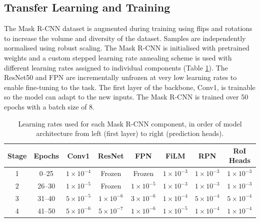 \documentclass[12pt]{article}
\begin{document}
\subsection{Transfer Learning and Training}

The Mask R-CNN dataset is augmented during training using flips and rotations to increase the volume and diversity of the dataset. Samples are independently normalised using robust scaling. The Mask R-CNN is initialised with pretrained weights and a custom stepped learning rate annealing scheme is used with different learning rates assigned to individual components (Table \ref{tab:stage_learning_rates}). The ResNet50 and FPN are incrementally unfrozen at very low learning rates to enable fine-tuning to the task. The first layer of the backbone, Conv1, is trainable so the model can adapt to the new inputs. The Mask R-CNN is trained over 50 epochs with a batch size of 8. 

\begin{table}[htbp]
    \centering
    \begin{threeparttable}
        \caption{Learning rates used for each Mask R-CNN component, in order of model architecture from left (first layer) to right (prediction heads).}
        \label{tab:stage_learning_rates}
        \begin{tabular}{c c c c c c c c}
            \hline
            Stage & Epochs &Conv1 & ResNet & FPN & FiLM & RPN & RoI Heads \\
            \hline
            1 & 0--25  & $1\times10^{-4}$ & Frozen & Frozen & $1\times10^{-3}$ & $1\times10^{-3}$ & $1\times10^{-3}$ \\
            2 & 26--30 & $1\times10^{-5}$ & Frozen & $1\times10^{-5}$ & $1\times10^{-3}$ & $1\times10^{-3}$ & $1\times10^{-3}$ \\
            3 & 31--40 & $5\times10^{-5}$ & $1\times10^{-6}$ & $3\times10^{-6}$ & $1\times10^{-4}$ & $5\times10^{-4}$ & $5\times10^{-4}$ \\
            4 & 41--50 & $5\times10^{-6}$ & $5\times10^{-7}$ & $1\times10^{-6}$ & $1\times10^{-5}$ & $1\times10^{-4}$ & $1\times10^{-4}$ \\
            \hline
        \end{tabular}
    \end{threeparttable}
\end{table}
\end{document}

